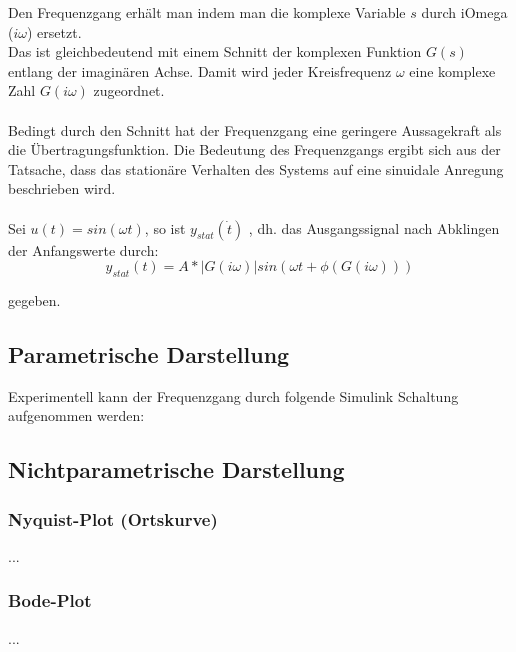 Den Frequenzgang erhält man indem man die komplexe Variable $s$ durch iOmega ($i\omega$) ersetzt. \\
Das ist gleichbedeutend mit einem Schnitt der komplexen Funktion $G(s)$ entlang der imaginären Achse.
Damit wird jeder Kreisfrequenz $\omega$ eine komplexe Zahl $G(i\omega)$ zugeordnet. 
\\
\\
Bedingt durch den Schnitt hat der Frequenzgang eine geringere Aussagekraft als die Übertragungsfunktion. 
Die Bedeutung des Frequenzgangs ergibt sich aus der Tatsache, dass das stationäre Verhalten des Systems auf eine sinuidale Anregung beschrieben wird.\\
\\

Sei $u(t) = sin(\omega t)$, so ist $y_{stat}(\dot{t})$ %
, dh. das Ausgangssignal nach Abklingen der Anfangswerte durch:
\begin{equation*}
    y_{stat}(t)=A*|G(i\omega )|sin(\omega t + \phi (G(i\omega )))
\end{equation*}

gegeben. %
\subsection{Parametrische Darstellung}
Experimentell kann der Frequenzgang durch folgende Simulink Schaltung aufgenommen werden:
 
\subsection{Nichtparametrische Darstellung}
\subsubsection{Nyquist-Plot (Ortskurve)}
...
\subsubsection{Bode-Plot}
...
